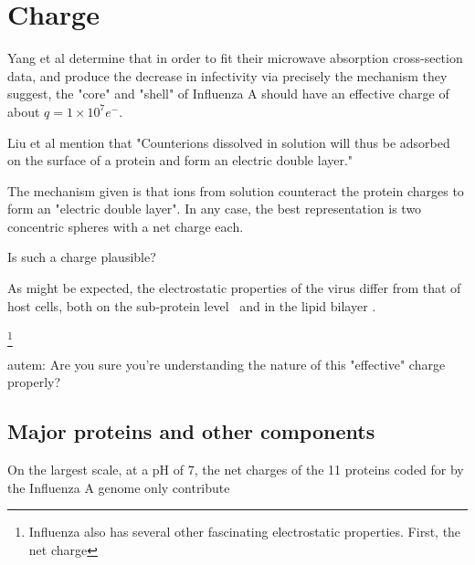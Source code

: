 \documentclass[paper.tex]{subfiles}
\begin{document}
\section{Charge}

Yang et al determine that in order to fit their microwave absorption cross-section data, and produce the decrease in infectivity via precisely the mechanism they suggest, the "core" and "shell" of Influenza A should have an effective charge of about $q=1 \times 10^7 e^-$. 

Liu et al mention that "Counterions
dissolved in solution will thus be adsorbed on the surface of
a protein and form an electric double layer."

The mechanism given is that ions from solution counteract the protein charges to form an "electric double layer". In any case, the best representation is two concentric spheres with a net charge each.

Is such a charge plausible? 

As might be expected, the electrostatic properties of the virus differ from that of host cells, both on the sub-protein level\cite{Icosahedral2019} \footnotemark \ and in the lipid bilayer \cite{Lipid2015} \footnotemark. 




\footnote{Influenza also has several other fascinating electrostatic properties. First, the net charge }

\begin{autem}
	autem: Are you sure you're understanding the nature of this "effective" charge properly?
\end{autem}

\subsection{Major proteins and other components}

On the largest scale, at a pH of 7, the net charges of the 11 proteins coded for by the Influenza A genome only contribute
\end{document}
